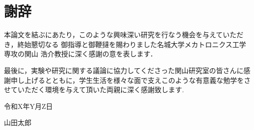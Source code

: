 \chapter*{謝辞}
本論文を結ぶにあたり，このような興味深い研究を行なう機会を与えていただき，終始懇切なる
御指導と御鞭撻を賜わりました名城大学メカトロニクス工学専攻の関山 浩介教授に深く感謝の意を表します． 

最後に，実験や研究に関する議論に協力してくださった関山研究室の皆さんに感謝申し上げるとともに，学生生活を様々な面で支えこのような有意義な勉学をさせていただく環境を与えて頂いた両親に深く感謝致します.
\begin{flushright}
令和X年Y月Z日

山田太郎
\end{flushright}